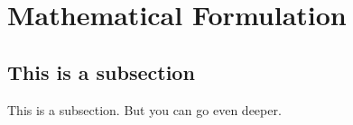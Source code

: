 \section{Mathematical Formulation}\label{Mathematical_Formulation}\thispagestyle{SectionFirstPage} %

\subsection{This is a subsection}
This is a subsection. But you can go even deeper. 


